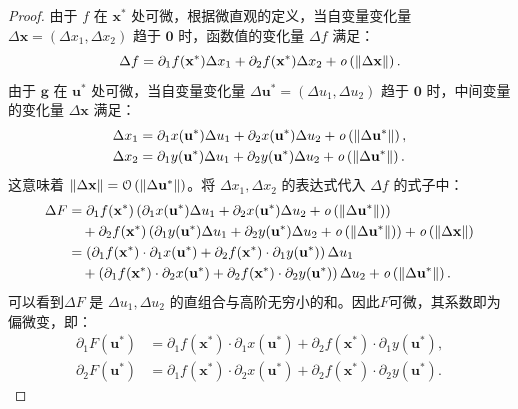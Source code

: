 \documentclass[12pt,UTF8]{ctexbook}
\begin{document}
\begin{proof}
由于 $f$ 在 $\mathbf{x}^*$ 处可微，根据微直观的定义，当自变量变化量 $\Delta \mathbf{x} = (\Delta x_1, \Delta x_2)$ 趋于 $\mathbf{0}$ 时，函数值的变化量 $\Delta f$ 满足：
$$ \Delta f = \partial_1 f(\mathbf{x}^*) \Delta x_1 + \partial_2 f(\mathbf{x}^*) \Delta x_2 + \mathit{o}\left(\|\Delta \mathbf{x}\|\right). $$
由于 $\mathbf{g}$ 在 $\mathbf{u}^*$ 处可微，当自变量变化量 $\Delta \mathbf{u}^* = (\Delta u_1, \Delta u_2)$ 趋于 $\mathbf{0}$ 时，中间变量的变化量 $\Delta \mathbf{x}$ 满足：
\begin{align*}
\Delta x_1 &= \partial_1 x(\mathbf{u}^*) \Delta u_1 + \partial_2 x(\mathbf{u}^*) \Delta u_2 + \mathit{o}\left(\|\Delta \mathbf{u}^*\|\right), \\
\Delta x_2 &= \partial_1 y(\mathbf{u}^*) \Delta u_1 + \partial_2 y(\mathbf{u}^*) \Delta u_2 + \mathit{o}\left(\|\Delta \mathbf{u}^*\|\right).
\end{align*}
这意味着 $\|\Delta \mathbf{x}\| = \mathcal{O}\left(\|\Delta \mathbf{u}^*\|\right)$。将 $\Delta x_1, \Delta x_2$ 的表达式代入 $\Delta f$ 的式子中：
\begin{align*}
\Delta F &= \partial_1 f(\mathbf{x}^*) \left( \partial_1 x(\mathbf{u}^*) \Delta u_1 + \partial_2 x(\mathbf{u}^*) \Delta u_2 + \mathit{o}\left(\|\Delta \mathbf{u}^*\|\right) \right) \\
&\quad + \partial_2 f(\mathbf{x}^*) \left( \partial_1 y(\mathbf{u}^*) \Delta u_1 + \partial_2 y(\mathbf{u}^*) \Delta u_2 + \mathit{o}\left(\|\Delta \mathbf{u}^*\|\right) \right) + \mathit{o}\left(\|\Delta \mathbf{x}\|\right) \\
&= \left( \partial_1 f(\mathbf{x}^*) \cdot \partial_1 x(\mathbf{u}^*) + \partial_2 f(\mathbf{x}^*) \cdot \partial_1 y(\mathbf{u}^*) \right) \Delta u_1 \\
&\quad + \left( \partial_1 f(\mathbf{x}^*) \cdot \partial_2 x(\mathbf{u}^*) + \partial_2 f(\mathbf{x}^*) \cdot \partial_2 y(\mathbf{u}^*) \right) \Delta u_2 + \mathit{o}\left(\|\Delta \mathbf{u}^*\|\right).
\end{align*}
可以看到$\Delta F$ 是 $\Delta u_1, \Delta u_2$ 的直组合与高阶无穷小的和。因此$F$可微，其系数即为偏微变，即：
\begin{align*}
    \partial_1 F(\mathbf{u}^*) &= \partial_1 f(\mathbf{x}^*) \cdot \partial_1 x(\mathbf{u}^*) + \partial_2 f(\mathbf{x}^*) \cdot \partial_1 y(\mathbf{u}^*), \\
    \partial_2 F(\mathbf{u}^*) &= \partial_1 f(\mathbf{x}^*) \cdot \partial_2 x(\mathbf{u}^*) + \partial_2 f(\mathbf{x}^*) \cdot \partial_2 y(\mathbf{u}^*).
\end{align*}
\end{proof}
\end{document}
